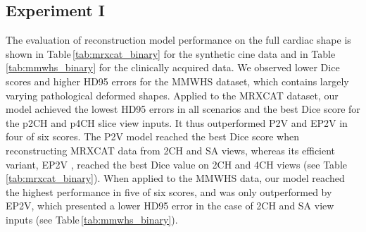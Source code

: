     \subsection{Experiment I}
     The evaluation of reconstruction model performance on the full cardiac shape is shown in Table\,\ref{tab:mrxcat_binary} for the synthetic cine data and in Table\,\ref{tab:mmwhs_binary} for the clinically acquired data. We observed lower Dice scores and higher HD95 errors for the MMWHS dataset, which contains largely varying pathological deformed shapes.
    Applied to the MRXCAT dataset, our model achieved the lowest HD95 errors in all scenarios and the best Dice score for the p2CH and p4CH slice view inputs. It thus outperformed P2V and EP2V in four of six scores.
    The P2V model \cite{xie2019pix2vox} reached the best Dice score when reconstructing MRXCAT data from 2CH and SA views, whereas its efficient variant, EP2V \cite{stojanovski2022efficient}, reached the best Dice value on 2CH and 4CH views (see Table\,\ref{tab:mrxcat_binary}).
    When applied to the MMWHS data, our model reached the highest performance in five of six scores,
    and was only outperformed by EP2V, which presented a lower HD95 error in the case of 2CH and SA view inputs (see Table\,\ref{tab:mmwhs_binary}).

